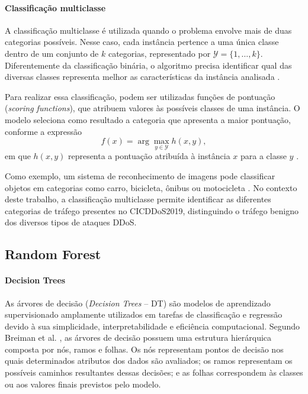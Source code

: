 \documentclass[
    12pt,                %
    openright,           %
    oneside,             %
    a4paper,             %
    english,             %
    brazil               %
]{abntex2}
\begin{document}
\paragraph{Classificação multiclasse}

A classificação multiclasse é utilizada quando o problema envolve mais de duas categorias possíveis. Nesse caso, cada instância pertence a uma única classe dentro de um conjunto de $k$ categorias, representado por $\mathcal{Y}=\{1,\ldots,k\}$. Diferentemente da classificação binária, o algoritmo precisa identificar qual das diversas classes representa melhor as características da instância analisada \cite{mohri2018}.

Para realizar essa classificação, podem ser utilizadas funções de pontuação (\textit{scoring functions}), que atribuem valores às possíveis classes de uma instância. O modelo seleciona como resultado a categoria que apresenta a maior pontuação, conforme a expressão
\[
f(x)=\arg\max_{y\in\mathcal{Y}} h(x,y),
\]
em que $h(x,y)$ representa a pontuação atribuída à instância $x$ para a classe $y$ \cite{mohri2018}.

Como exemplo, um sistema de reconhecimento de imagens pode classificar objetos em categorias como carro, bicicleta, ônibus ou motocicleta \cite{mohri2018}. No contexto deste trabalho, a classificação multiclasse permite identificar as diferentes categorias de tráfego presentes no CICDDoS2019, distinguindo o tráfego benigno dos diversos tipos de ataques DDoS.

\subsection{Random Forest}

\paragraph{Decision Trees}

As árvores de decisão (\textit{Decision Trees} -- DT) são modelos de aprendizado supervisionado amplamente utilizados em tarefas de classificação e regressão devido à sua simplicidade, interpretabilidade e eficiência computacional. Segundo Breiman et al. \cite{breiman1984}, as árvores de decisão possuem uma estrutura hierárquica composta por nós, ramos e folhas. Os nós representam pontos de decisão nos quais determinados atributos dos dados são avaliados; os ramos representam os possíveis caminhos resultantes dessas decisões; e as folhas correspondem às classes ou aos valores finais previstos pelo modelo.
\end{document}
